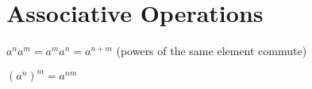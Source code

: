 
\chapter{Associative Operations}


\begin{lemma}
	$a^na^m = a^ma^n = a^{n+m}$ (powers of the same element commute)
\end{lemma}

\begin{lemma}
	$(a^n)^m = a^{nm}$
\end{lemma}

